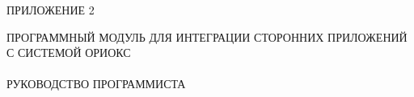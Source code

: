 \begin{flushright}
  ПРИЛОЖЕНИЕ 2
\end{flushright}
\vfill
\begin{center}
  \uppercase{Программный модуль для интеграции сторонних приложений с системой ОРИОКС\\~\\
  Руководство программиста}
\end{center}
\vfill

\setcounter{page}{1}
\thispagestyle{empty}
